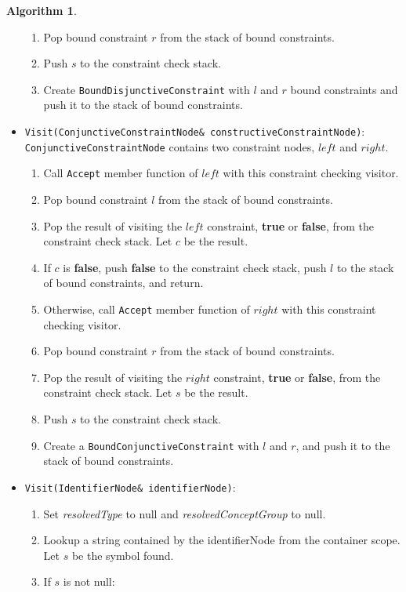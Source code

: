 \documentclass[a4paper,oneside,11pt]{book}
\theoremstyle{definition}
\newtheorem{algo}{Algorithm}[section]
\begin{document}
\begin{algo}
\begin{itemize}
\begin{enumerate}
\item
Pop bound constraint $r$ from the stack of bound constraints.
\item
Push $s$ to the constraint check stack.
\item
Create \verb|BoundDisjunctiveConstraint| with $l$ and $r$ bound constraints and push it to the stack of bound constraints.
\end{enumerate}
\item
\verb|Visit(ConjunctiveConstraintNode& constructiveConstraintNode)|:\\
\verb|ConjunctiveConstraintNode| contains two constraint nodes, $left$ and $right$.
\begin{enumerate}
\item
Call \verb|Accept| member function of $left$ with this constraint checking visitor.
\item
Pop bound constraint $l$ from the stack of bound constraints.
\item
Pop the result of visiting the $left$ constraint, \textbf{true} or \textbf{false}, from the constraint check stack. Let $c$ be the result.
\item
If $c$ is \textbf{false}, push \textbf{false} to the constraint check stack, push $l$ to the stack of bound constraints, and return.
\item
Otherwise, call \verb|Accept| member function of $right$ with this constraint checking visitor.
\item
Pop bound constraint $r$ from the stack of bound constraints.
\item
Pop the result of visiting the $right$ constraint, \textbf{true} or \textbf{false}, from the constraint check stack. Let $s$ be the result.
\item
Push $s$ to the constraint check stack.
\item
Create a \verb|BoundConjunctiveConstraint| with $l$ and $r$, and push it to the stack of bound constraints.
\end{enumerate}
\item
\verb|Visit(IdentifierNode& identifierNode)|:\\
\begin{enumerate}
\item
Set \emph{resolvedType} to null and \emph{resolvedConceptGroup} to null.
\item
Lookup a string contained by the identifierNode from the container scope. Let $s$ be the symbol found.
\item
If $s$ is not null:
\begin{enumerate}

\end{enumerate}
\end{enumerate}
\end{itemize}
\end{algo}
\end{document}
